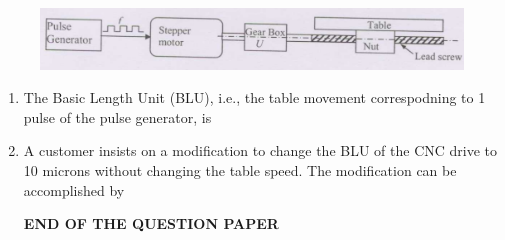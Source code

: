 \documentclass[journal,12pt,onecolumn]{IEEEtran}
\begin{document}
\begin{figure}[H]
    \centering
    \includegraphics[scale=0.3]{q84.png}
    \caption{}
    \label{png}
\end{figure}
\begin{enumerate}[resume]
    \item The Basic Length Unit (BLU), i.e., the table movement correspodning to 1 pulse of the pulse generator, is
          \begin{enumerate}
          \end{enumerate}

    \item A customer insists on a modification to change the BLU of the CNC drive to 10 microns without changing the table speed. The modification can be accomplished by
          \begin{enumerate}
          \end{enumerate}
          \vspace{1cm}
          \centering\Large\textbf{END OF THE QUESTION PAPER}
\end{enumerate}
\end{document}
